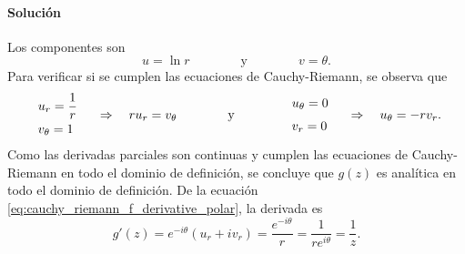 \documentclass[a4paper]{report}
\begin{document}
\paragraph{Solución} Los componentes son 
 \[
  u=\ln r
  \qquad\qquad\textrm{y}\qquad\qquad
  v=\theta.
 \]
 Para verificar si se cumplen las ecuaciones de Cauchy-Riemann, se observa que 
 \[
 \begin{array}{l}
  u_r=\dfrac{1}{r}\\[\medskipamount]
  v_\theta=1
 \end{array}
 \quad\Rightarrow\quad ru_r=v_\theta
 \qquad\qquad\textrm{y}\qquad\qquad
 \begin{array}{l}
  u_\theta=0\\[\medskipamount]
  v_r=0
 \end{array}
 \quad\Rightarrow\quad u_\theta=-rv_r.
 \]
 Como las derivadas parciales son continuas y cumplen las ecuaciones de Cauchy-Riemann en todo el dominio de definición, se concluye que \(g(z)\) es analítica en todo el dominio de definición. De la ecuación \ref{eq:cauchy_riemann_f_derivative_polar}, la derivada es
 \[
  g'(z)=e^{-i\theta}(u_r+iv_r)=\frac{e^{-i\theta}}{r}=\frac{1}{re^{i\theta}}=\frac{1}{z}.
 \]
\end{document}
